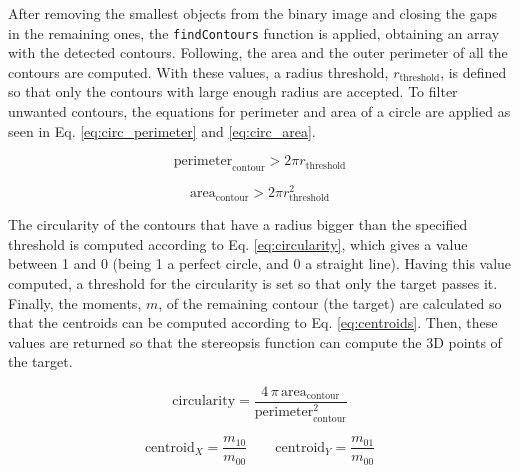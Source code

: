 After removing the smallest objects from the binary image and closing the gaps in the remaining ones, the \texttt{findContours} function is applied, obtaining an array with the detected contours.
Following, the area and the outer perimeter of all the contours are computed. With these values, a radius threshold, $r_\mathrm{threshold}$, is defined so that only the contours with large enough radius are accepted.
To filter unwanted contours, the equations for perimeter and area of a circle are applied as seen in Eq. \eqref{eq:circ_perimeter} and \eqref{eq:circ_area}.

\begin{equation}
\mathrm{perimeter}_\mathrm{contour} > 2 \pi r_\mathrm{threshold}
\label{eq:circ_perimeter}
\end{equation}

\begin{equation}
\mathrm{area}_\mathrm{contour} > 2 \pi r_\mathrm{threshold}^{2}
\label{eq:circ_area}
\end{equation}

The circularity of the contours that have a radius bigger than the specified threshold is computed according to Eq. \eqref{eq:circularity}, which gives a value between 1 and 0 (being 1 a perfect circle, and 0 a straight line). Having this value computed, a threshold for the circularity is set so that only the target passes it. Finally, the moments, $m$, of the remaining contour (the target) are calculated so that the centroids can be computed according to Eq. \eqref{eq:centroids}. Then, these values are returned so that the stereopsis function can compute the 3D points of the target.

\begin{equation}
\mathrm{circularity} = \frac{4 \, \pi \, \mathrm{area}_\mathrm{contour}}{\mathrm{perimeter}_\mathrm{contour}^{2}}
\label{eq:circularity}
\end{equation}

\begin{equation}
\mathrm{centroid}_{X} = \frac{m_{10}}{m_{00}} \qquad \mathrm{centroid}_{Y}=\frac{m_{01}}{m_{00}}
\label{eq:centroids}
\end{equation}


